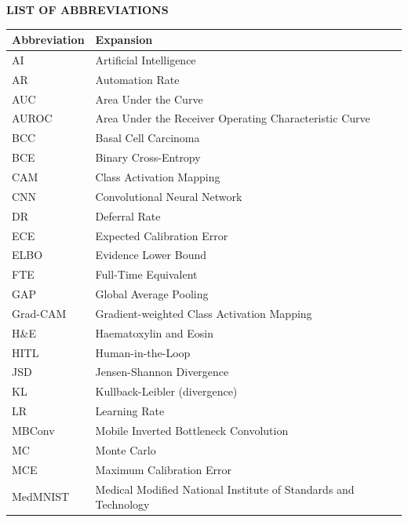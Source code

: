 \documentclass[12pt,a4paper]{report}
\begin{document}
\newpage
\begin{center}
{\large\bfseries LIST OF ABBREVIATIONS}
\end{center}

\vspace{0.5cm}

\begin{longtable}{@{} >{\footnotesize}p{3.2cm} >{\footnotesize}p{10.6cm} @{}}
\toprule
\textbf{Abbreviation} & \textbf{Expansion} \\
\midrule
AI     & Artificial Intelligence \\[3pt]
AR     & Automation Rate \\[3pt]
AUC    & Area Under the Curve \\[3pt]
AUROC  & Area Under the Receiver Operating Characteristic Curve \\[3pt]
BCC    & Basal Cell Carcinoma \\[3pt]
BCE    & Binary Cross-Entropy \\[3pt]
CAM    & Class Activation Mapping \\[3pt]
CNN    & Convolutional Neural Network \\[3pt]
DR     & Deferral Rate \\[3pt]
ECE    & Expected Calibration Error \\[3pt]
ELBO   & Evidence Lower Bound \\[3pt]
FTE    & Full-Time Equivalent \\[3pt]
GAP    & Global Average Pooling \\[3pt]
Grad-CAM & Gradient-weighted Class Activation Mapping \\[3pt]
H\&E   & Haematoxylin and Eosin \\[3pt]
HITL   & Human-in-the-Loop \\[3pt]
JSD    & Jensen-Shannon Divergence \\[3pt]
KL     & Kullback-Leibler (divergence) \\[3pt]
LR     & Learning Rate \\[3pt]
MBConv & Mobile Inverted Bottleneck Convolution \\[3pt]
MC     & Monte Carlo \\[3pt]
MCE    & Maximum Calibration Error \\[3pt]
MedMNIST & Medical Modified National Institute of Standards and Technology \\[3pt]

\end{longtable}
\end{document}
